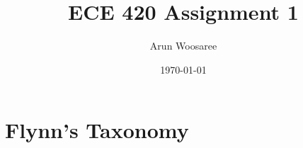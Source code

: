 \documentclass[letterpaper]{article}
\author{Arun Woosaree}
\date{\today}
\title{ECE 420 Assignment 1}
\begin{document}
\maketitle

\section{Flynn's Taxonomy}
\label{sec:org432dfc2}
\end{document}

